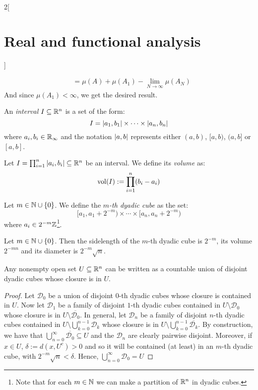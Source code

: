 \documentclass[../../../main_math.tex]{subfiles}
\begin{document}
\begin{multicols}{2}[\section{Real and functional analysis}]
\begin{sproof}
\begin{enumerate}
\begin{align*}
                       & =\mu(A)+\mu(A_1)-\lim_{N\to\infty}\mu(A_N)
            \end{align*}
            And since $\mu(A_1)<\infty$, we get the desired result.
    \end{enumerate}
  \end{sproof}
  \begin{definition}
    An \emph{interval} $I\subseteq\mathbb{R}^n$ is a set of the form:
    $$I=\abs{a_1,b_1}\times\cdots\times\abs{a_n,b_n}$$
    where $a_i,b_i\in\mathbb{R}_\infty$ and the notation $\abs{a,b}$ represents either $(a,b)$, $[a,b)$, $(a,b]$ or $[a,b]$.
  \end{definition}
  \begin{definition}
    Let $I=\prod_{i=1}^n\abs{a_i,b_i}\subseteq\mathbb{R}^n$ be an interval. We define its \emph{volume} as:
    $$\operatorname{vol}(I):=\prod_{i=1}^n(b_i-a_i)$$
  \end{definition}
  \begin{definition}
    Let $m\in\mathbb{N}\cup\{0\}$. We define the \emph{$m$-th dyadic cube} as the set: $$[a_1,a_1+2^{-m})\times\cdots\times [a_n,a_n+2^{-m})$$
    where $a_i\in 2^{-m}\mathbb{Z}$\footnote{Note that for each $m\in\mathbb{N}$ we can make a partition of $\mathbb{R}^n$ in dyadic cubes.}.
  \end{definition}
  \begin{lemma}
    Let $m\in\mathbb{N}\cup\{0\}$. Then the sidelength of the $m$-th dyadic cube is $2^{-m}$, its volume $2^{-mn}$ and its diameter is $2^{-m}\sqrt{n}$.
  \end{lemma}
  \begin{proposition}
    Any nonempty open set $U\subseteq\mathbb{R}^n$ can be written as a countable union of disjoint dyadic cubes whose closure is in $U$.
  \end{proposition}
  \begin{proof}
    Let $\mathcal{D}_0$ be a union of disjoint $0$-th dyadic cubes whose closure is contained in $U$. Now let $\mathcal{D}_1$ be a family of disjoint $1$-th dyadic cubes contained in $U\setminus\mathcal{D}_0$ whose closure is in $U\setminus\overline{\mathcal{D}_0}$. In general, let $\mathcal{D}_n$ be a family of disjoint $n$-th dyadic cubes contained in $U\setminus\bigcup_{k=0}^{n-1}\mathcal{D}_k$ whose closure is in $U\setminus\bigcup_{k=0}^{n-1}\overline{\mathcal{D}_k}$. By construction, we have that $\bigcup_{n=0}^\infty \overline{\mathcal{D}_0}\subseteq U$ and the $\mathcal{D}_n$ are clearly pairwise disjoint. Moreover, if $x\in U$, $\delta:=d(x,U^c)>0$ and so it will be contained (at least) in an $m$-th dyadic cube, with $2^{-m}\sqrt{n}<\delta$. Hence, $\bigcup_{n=0}^\infty \mathcal{D}_0=U$

\end{proof}
\end{multicols}
\end{document}
